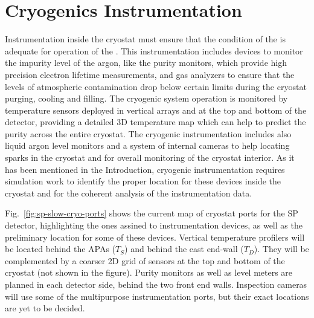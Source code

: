 \section{Cryogenics Instrumentation}
\label{sec:fdsp-cryo-instr} %
\label{sec:fddp-cryo-instr} %
\label{sec:fdgen-cryo-instr} %

Instrumentation inside the cryostat must ensure that the condition of the  is adequate for operation of the .
This instrumentation includes devices to monitor the impurity level of the argon, like the purity monitors, which provide high precision electron lifetime measurements,
and gas analyzers to ensure that the levels of atmospheric contamination drop below certain limits during the cryostat purging, cooling and filling.
The cryogenic system operation is monitored by temperature sensors deployed in vertical arrays and at the top and bottom of the detector, providing a 
detailed 3D temperature map which can help to predict the  purity across the entire cryostat. The cryogenic instrumentation includes also liquid argon level monitors and
a system of internal cameras to help locating sparks in the cryostat and for overall monitoring of the cryostat interior. 
As it has been mentioned in the Introduction, cryogenic instrumentation requires simulation work to identify the proper location for these devices inside the cryostat and
for the coherent analysis of the instrumentation data. 


Fig.~\ref{fig:sp-slow-cryo-ports} shows the current map of cryostat ports for the SP detector, highlighting the ones assined to instrumentation devices,
as well as the preliminary location for some of these devices. Vertical temperature profilers will be located behind the APAs ($T_S$) and behind the east end-wall ($T_D$).
They will be complemented by a coarser 2D grid of sensors at the top and bottom of the cryostat (not shown in the figure). Purity monitors as well as level meters are planned
in each detector side, behind the two front end walls. Inspection cameras will use some of the multipurpose instrumentation ports, but their exact locations are yet to be decided. 

